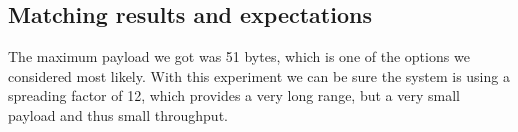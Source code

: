 	\subsection{Matching results and expectations}
		The maximum payload we got was 51 bytes, which is one of the options we considered most likely. With this experiment we can be sure the system is using a spreading factor of 12, which provides a very long range, but a very small payload and thus small throughput.

